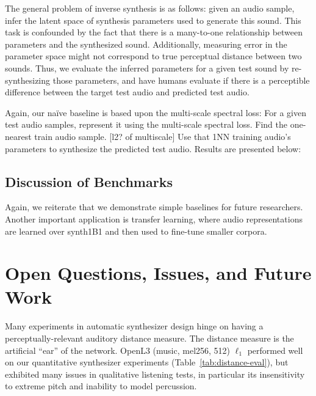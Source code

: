 The general problem of inverse synthesis is as follows: given an audio sample, infer the latent space of synthesis parameters used to generate this sound. This task is confounded by the fact that there is a many-to-one relationship between parameters and the synthesized sound. Additionally, measuring error in the parameter space might not correspond to true perceptual distance between two sounds. Thus, we evaluate the inferred parameters for a given test sound by re-synthesizing those parameters, and have humans evaluate if there is a perceptible difference between the target test audio and predicted test audio.


Again, our na\"{i}ve baseline is based upon the multi-scale spectral loss: For a given test audio samples, represent it using the multi-scale spectral loss. Find the one-nearest train audio sample. [l2? of multiscale] Use that 1NN training audio's parameters to synthesize the predicted test audio. Results are presented below:


\subsection{Discussion of Benchmarks}

Again, we reiterate that we demonstrate simple baselines for future researchers. Another important application is transfer learning, where audio representations are learned over synth1B1 and then used to fine-tune smaller corpora.
\fi


\section{Open Questions, Issues, and Future Work}
\label{sec:issues}


Many experiments in automatic synthesizer design hinge on having a perceptually-relevant auditory distance measure. The distance measure is the artificial ``ear'' of the network.
OpenL3 (music, mel256, 512) $\ell_1$ performed well on our quantitative synthesizer experiments (Table~\ref{tab:distance-eval}), but exhibited many issues in qualitative listening tests, in particular its insensitivity to extreme pitch and inability to model percussion.

